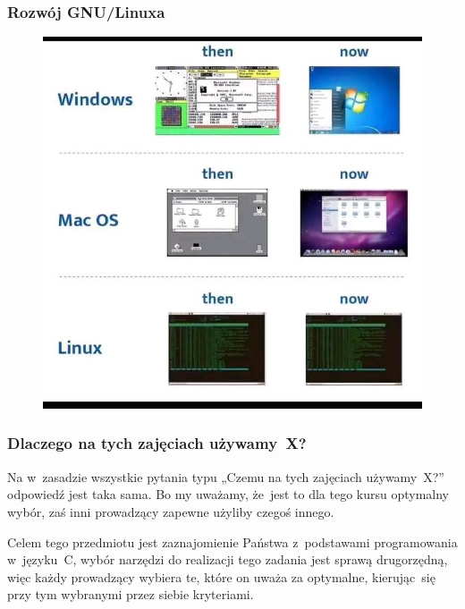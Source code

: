 \documentclass[10pt,t]{beamer}
\begin{document}
\begin{frame}
  \frametitle{Rozwój GNU/Linuxa}

  \vspace{-0.5em}


  \begin{figure}

    \label{fig:Evolution-of-OS}

    \centering


    \includegraphics[scale=0.3]
    {./Presentations-pictures/Evolution-of-operating-systems.jpg}

  \end{figure}

\end{frame}





\begin{frame}
  \frametitle{Dlaczego na tych zajęciach używamy~X?}


  Na w~zasadzie wszystkie pytania typu „Czemu na tych zajęciach
  używamy~X?” odpowiedź jest taka sama. Bo my uważamy, że~jest to dla tego
  kursu optymalny wybór, zaś inni prowadzący zapewne użyliby czegoś innego.

  Celem tego przedmiotu jest zaznajomienie Państwa z~podstawami
  programowania w~języku~C, wybór narzędzi do realizacji tego zadania jest
  sprawą drugorzędną, więc każdy prowadzący wybiera te, które on uważa za
  optymalne, kierując~się przy tym wybranymi przez siebie kryteriami.

\end{frame}
\end{document}
